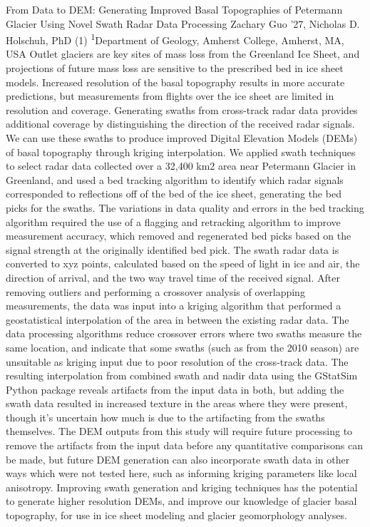 \makeabstract
{
From Data to DEM: Generating Improved Basal Topographies of Petermann Glacier Using Novel Swath Radar Data Processing 
}
{
Zachary Guo '27, Nicholas D. Holschuh, PhD (1)
}
{
\textsuperscript{1}Department of Geology, Amherst College, Amherst, MA, USA
}
{
Outlet glaciers are key sites of mass loss from the Greenland Ice Sheet, and projections of future mass loss are sensitive to the prescribed bed in ice sheet models. Increased resolution of the basal topography results in more accurate predictions, but measurements from flights over the ice sheet are limited in resolution and coverage. Generating swaths from cross-track radar data provides additional coverage by distinguishing the direction of the received radar signals. We can use these swaths to produce improved Digital Elevation Models (DEMs) of basal topography through kriging interpolation.
}
{
We applied swath techniques to select radar data collected over a 32,400 km2 area near Petermann Glacier in Greenland, and used a bed tracking algorithm to identify which radar signals corresponded to reflections off of the bed of the ice sheet, generating the bed picks for the swaths. The variations in data quality and errors in the bed tracking algorithm required the use of a flagging and retracking algorithm to improve measurement accuracy, which removed and regenerated bed picks based on the signal strength at the originally identified bed pick. The swath radar data is converted to xyz points, calculated based on the speed of light in ice and air, the direction of arrival, and the two way travel time of the received signal. After removing outliers and performing a crossover analysis of overlapping measurements, the data was input into a kriging algorithm that performed a geostatistical interpolation of the area in between the existing radar data.
}
{
The data processing algorithms reduce crossover errors where two swaths measure the same location, and indicate that some swaths (such as from the 2010 season) are unsuitable as kriging input due to poor resolution of the cross-track data. The resulting interpolation from combined swath and nadir data using the GStatSim Python package reveals artifacts from the input data in both, but adding the swath data resulted in increased texture in the areas where they were present, though it’s uncertain how much is due to the artifacting from the swaths themselves.
}
{
The DEM outputs from this study will require future processing to remove the artifacts from the input data before any quantitative comparisons can be made, but future DEM generation can also incorporate swath data in other ways which were not tested here, such as informing kriging parameters like local anisotropy. Improving swath generation and kriging techniques has the potential to generate higher resolution DEMs, and improve our knowledge of glacier basal topography, for use in ice sheet modeling and glacier geomorphology analyses.
}

\newpage
